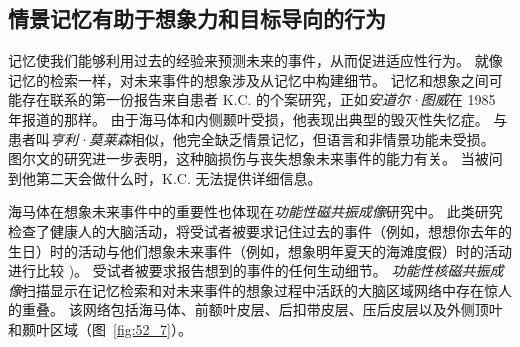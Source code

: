 \subsection{情景记忆有助于想象力和目标导向的行为}

记忆使我们能够利用过去的经验来预测未来的事件，从而促进适应性行为。
就像记忆的检索一样，对未来事件的想象涉及从记忆中构建细节。
记忆和想象之间可能存在联系的第一份报告来自患者 K.C. 的个案研究，正如\textit{安道尔·图威}在 1985 年报道的那样。
由于海马体和内侧颞叶受损，他表现出典型的毁灭性失忆症。
与患者叫\textit{亨利·莫莱森}相似，他完全缺乏情景记忆，但语言和非情景功能未受损。
图尔文的研究进一步表明，这种脑损伤与丧失想象未来事件的能力有关。
当被问到他第二天会做什么时，K.C. 无法提供详细信息。


海马体在想象未来事件中的重要性也体现在\textit{功能性磁共振成像}研究中。
此类研究检查了健康人的大脑活动，将受试者被要求记住过去的事件（例如，想想你去年的生日）时的活动与他们想象未来事件（例如，想象明年夏天的海滩度假）时的活动进行比较 )。
受试者被要求报告想到的事件的任何生动细节。
\textit{功能性核磁共振成像}扫描显示在记忆检索和对未来事件的想象过程中活跃的大脑区域网络中存在惊人的重叠。
该网络包括海马体、前额叶皮层、后扣带皮层、压后皮层以及外侧顶叶和颞叶区域（图~\ref{fig:52_7}）。


